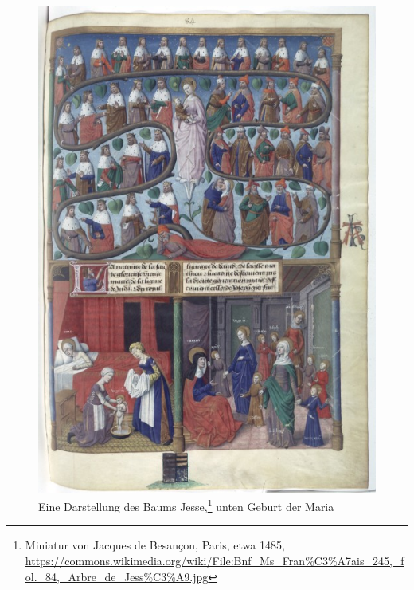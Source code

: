 \documentclass[a4paper]{book}
\begin{document}
\begin{samepage}
\begin{multicols}{2}
\end{multicols}

\end{samepage}

\begin{figure}[h]
\begin{center}
\includegraphics[height=30\baselineskip]{Tree_of_Jesse.jpeg}
\caption{Eine Darstellung des Baums Jesse,\footnote{Miniatur von Jacques de Besançon, Paris, etwa 1485, \url{https://commons.wikimedia.org/wiki/File:Bnf_Ms_Fran\%C3\%A7ais_245,_fol._84,_Arbre_de_Jess\%C3\%A9.jpg}} unten Geburt der Maria}
\end{center}
\end{figure}
\end{document}

